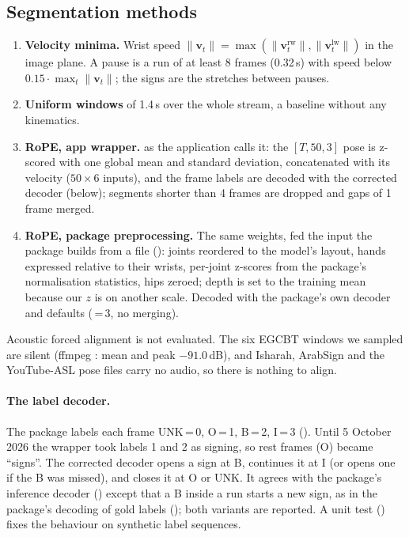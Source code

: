 \subsection{Segmentation methods}
\begin{enumerate}[leftmargin=*,itemsep=2pt]
  \item \textbf{Velocity minima.} Wrist speed $\lVert \mathbf{v}_t \rVert = \max(\lVert \mathbf{v}^{\text{rw}}_t \rVert, \lVert \mathbf{v}^{\text{lw}}_t \rVert)$ in the image plane. A pause is a run of at least 8 frames (0.32\,s) with speed below $0.15 \cdot \max_t \lVert \mathbf{v}_t \rVert$; the signs are the stretches between pauses.
  \item \textbf{Uniform windows} of 1.4\,s over the whole stream, a baseline without any kinematics.
  \item \textbf{RoPE, app wrapper.}  as the application calls it: the $[T,50,3]$ pose is z-scored with one global mean and standard deviation, concatenated with its velocity ($50 \times 6$ inputs), and the frame labels are decoded with the corrected decoder (below); segments shorter than 4 frames are dropped and gaps of 1 frame merged.
  \item \textbf{RoPE, package preprocessing.} The same weights, fed the input the package builds from a  file (): joints reordered to the model's layout, hands expressed relative to their wrists, per-joint z-scores from the package's normalisation statistics, hips zeroed; depth is set to the training mean because our $z$ is on another scale. Decoded with the package's own decoder and defaults (\,=\,3, no merging).
\end{enumerate}
Acoustic forced alignment is not evaluated. The six EGCBT windows we sampled are silent (ffmpeg : mean and peak $-91.0$\,dB), and Isharah, ArabSign and the YouTube-ASL pose files carry no audio, so there is nothing to align.

\begin{sloppypar}
\paragraph{The label decoder.} The package labels each frame UNK\,=\,0, O\,=\,1, B\,=\,2, I\,=\,3
(). Until 5 October 2026 the wrapper took labels 1 and 2 as
signing, so rest frames (O) became ``signs''. The corrected decoder opens a sign at B, continues it at I (or opens one
if the B was missed), and closes it at O or UNK. It agrees with the package's inference decoder
() except that a B inside a run starts a new sign, as in the package's
decoding of gold labels (); both variants are reported. A unit test
() fixes the behaviour on synthetic label sequences.
\end{sloppypar}

